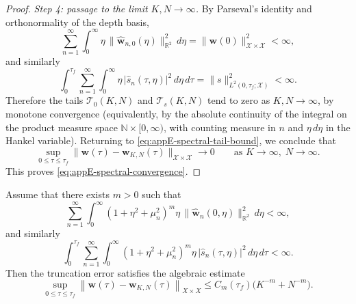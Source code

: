 \begin{proof}
    \smallskip
    \noindent
    \textit{Step 4: passage to the limit \(K,N\to\infty\).}
    By Parseval's identity and orthonormality of the depth basis,
    \[
        \sum_{n=1}^\infty\int_0^\infty
        \eta\,\bigl\|\widehat{\mathbf w}_{n,0}(\eta)\bigr\|_{\mathbb R^2}^2\, d\eta
        =
        \bigl\|\mathbf w(0)\bigr\|_{\mathcal X\times\mathcal X}^2
        <
        \infty,
    \]
    and similarly
    \[
        \int_0^{\tau_f}
        \sum_{n=1}^\infty\int_0^\infty
        \eta\, |\widehat s_n(\tau,\eta)|^2\, d\eta\, d\tau
        =
        \|s\|_{L^2(0,\tau_f;\mathcal X)}^2
        <
        \infty.
    \]
    Therefore the tails \(\mathcal T_0(K,N)\) and \(\mathcal T_s(K,N)\) tend to
    zero as \(K,N\to\infty\), by monotone convergence (equivalently, by the
    absolute continuity of the integral on the product measure space
    \(\mathbb N\times [0,\infty)\), with counting measure in \(n\) and
    \(\eta\,d\eta\) in the Hankel variable). Returning to
    \eqref{eq:appE-spectral-tail-bound}, we conclude that
    \[
        \sup_{0\le \tau\le \tau_f}
        \bigl\|\mathbf w(\tau)-\mathbf w_{K,N}(\tau)\bigr\|_{\mathcal X\times\mathcal X}
        \longrightarrow 0
        \qquad
        \text{as } K\to\infty,\; N\to\infty.
    \]
    This proves \eqref{eq:appE-spectral-convergence}.
\end{proof}

\begin{corollary}
    \label{cor:appE-algebraic-rate}
    Assume that there exists \(m>0\) such that
    \begin{equation}
        \sum_{n=1}^\infty \int_0^\infty
        (1+\eta^2+\mu_n^2)^m
        \eta\, \|\widehat{\mathbf{w}}_n(0,\eta)\|_{\mathbb{R}^2}^2\, d\eta
        <\infty,
        \label{eq:appE-spectral-regularity-initial}
    \end{equation}
    and similarly
    \begin{equation}
        \int_0^{\tau_f}
        \sum_{n=1}^\infty \int_0^\infty
        (1+\eta^2+\mu_n^2)^m
        \eta\, |\widehat{s}_n(\tau,\eta)|^2\, d\eta\, d\tau
        <\infty.
        \label{eq:appE-spectral-regularity-source}
    \end{equation}
    Then the truncation error satisfies the algebraic estimate
    \begin{equation}
        \sup_{0\le \tau\le \tau_f}
        \left\|
        \mathbf{w}(\tau)-\mathbf{w}_{K,N}(\tau)
        \right\|_{X\times X}
        \le
        C_m(\tau_f)\bigl(K^{-m}+N^{-m}\bigr).
        \label{eq:appE-spectral-rate}
    \end{equation}
\end{corollary}

